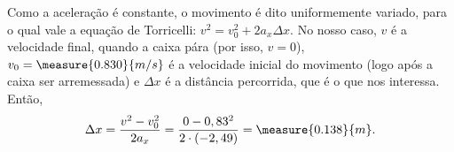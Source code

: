 \begin{question}
\begin{solution}
		Como a aceleração é constante, o movimento é dito uniformemente variado, para o qual vale a equação de Torricelli: $v^2 = v_0^2 + 2 a_x \Delta x$.
		No nosso caso, $v$ é a velocidade final, quando a caixa pára (por isso, $v = 0$), $v_0 = \measure{0.830}{m/s}$ é a velocidade inicial do movimento (logo após a caixa ser arremessada) e $\Delta x$ é a distância percorrida, que é o que nos interessa.
		Então,
		\begin{equation*}
			\Delta x = \frac{v^2 - v_0^2}{2a_x} = \frac{0 - 0,83^2}{2\cdot (-2,49)} = \measure{0.138}{m}.
		\end{equation*}
	\end{solution}
\end{question}


